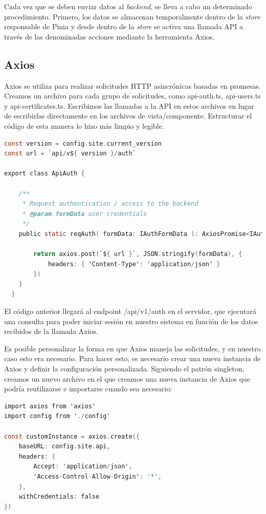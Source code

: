 Cada vez que se deben enviar datos al \textit{backend}, se lleva a cabo un determinado procedimiento. Primero, los datos se almacenan temporalmente dentro de la \textit{store} responsable de Pinia y desde dentro de la \textit{store} se activa una llamada API a través de las denominadas acciones mediante la herramienta Axios.

\subsection{Axios}
Axios se utiliza para realizar solicitudes HTTP asincrónicas basadas en promesas. Creamos un archivo para cada grupo de solicitudes, como api-auth.ts, api-users.ts y api-certificates.ts. Escribimos las llamadas a la API en estos archivos en lugar de escribirlas directamente en los archivos de vista/componente. Estructurar el código de esta manera lo hizo más limpio y legible.

\begin{lstlisting}[language=C,caption={Ejemplo de una solicitud al servidor usando axios}, label={lst:axios}]
const version = config.site.current_version
const url = `api/v${ version }/auth`

export class ApiAuth {

    /**
     * Request authentication / access to the backend
     * @param formData user credentials
     */
    public static reqAuth( formData: IAuthFormData ): AxiosPromise<IAuthResponse> {

        return axios.post(`${ url }`, JSON.stringify(formData), {
            headers: { 'Content-Type': 'application/json' }
        })
    }
  }
\end{lstlisting}

El código anterior llegará al endpoint /api/v1/auth en el servidor, que ejecutará una consulta para poder iniciar sesión en nuestro sistema en función de los datos recibidos de la llamada Axios.

Es posible personalizar la forma en que Axios maneja las solicitudes, y en nuestro caso esto era necesario. Para hacer esto, es necesario crear una nueva instancia de Axios y definir la configuración personalizada. Siguiendo el patrón singleton, creamos un nuevo archivo en el que creamos una nueva instancia de Axios que podría reutilizarse e importarse cuando sea necesario:

\begin{lstlisting}[language=C,caption={Instancia única de Axios}, label={lst:axios1}]
import axios from 'axios'
import config from './config'

const customInstance = axios.create({
    baseURL: config.site.api,
    headers: {
        Accept: 'application/json',
        'Access-Control-Allow-Origin': '*',
    },
    withCredentials: false
})
\end{lstlisting}

